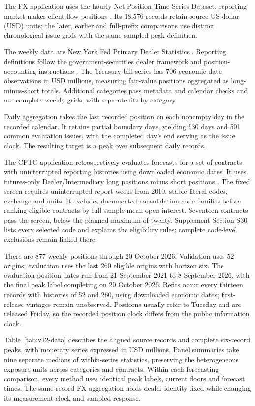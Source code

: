 \documentclass[11pt,a4paper]{article}
\begin{document}
The FX application uses the hourly Net Position Time Series Dataset, reporting market-maker client-flow positions \citep{dataset,wisniewski2020}. Its 18,576 records retain source US dollar (USD) units; the later, earlier and full-prefix comparisons use distinct chronological issue grids with the same sampled-peak definition.

The weekly data are New York Fed Primary Dealer Statistics \citep{nyfeddata}. Reporting definitions follow the government-securities dealer framework and position-accounting instructions \citep{fr2004_2013,fr2004_2024}. The Treasury-bill series has 706 economic-date observations in USD millions, measuring fair-value positions aggregated as long-minus-short totals. Additional categories pass metadata and calendar checks and use complete weekly grids, with separate fits by category.

Daily aggregation takes the last recorded position on each nonempty day in the recorded calendar. It retains partial boundary days, yielding 930 days and 501 common evaluation issues, with the completed day's end serving as the issue clock. The resulting target is a peak over subsequent daily records.

The CFTC application retrospectively evaluates forecasts for a set of contracts with uninterrupted reporting histories using downloaded economic dates. It uses futures-only Dealer/Intermediary long positions minus short positions \citep{cftcTFF}. The fixed screen requires uninterrupted report weeks from 2010, stable literal codes, exchange and units. It excludes documented consolidation-code families before ranking eligible contracts by full-sample mean open interest. Seventeen contracts pass the screen, below the planned maximum of twenty. Supplement Section S30 lists every selected code and explains the eligibility rules; complete code-level exclusions remain linked there.

There are 877 weekly positions through 20 October 2026. Validation uses 52 origins; evaluation uses the last 260 eligible origins with horizon six. The evaluation position dates run from 21 September 2021 to 8 September 2026, with the final peak label completing on 20 October 2026. Refits occur every thirteen records with histories of 52 and 260, using downloaded economic dates; first-release vintages remain unobserved. Positions usually refer to Tuesday and are released Friday, so the recorded position clock differs from the public information clock.

Table~\ref{tab:v12-data} describes the aligned source records and complete six-record peaks, with monetary series expressed in USD millions. Panel summaries take nine separate medians of within-series statistics, preserving the heterogeneous exposure units across categories and contracts. Within each forecasting comparison, every method uses identical peak labels, current floors and forecast times. The same-record FX aggregation holds dealer identity fixed while changing its measurement clock and sampled response.
\end{document}
